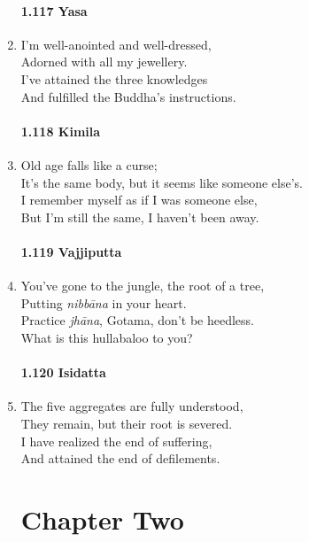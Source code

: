 \documentclass[10pt, openany]{book}
\begin{document}
\begin{enumerate}
\subsubsection*{1.117 Yasa}

\item I’m well-anointed and well-dressed,\\
Adorned with all my jewellery.\\
I’ve attained the three knowledges\\
And fulfilled the Buddha’s instructions.

\subsubsection*{1.118 Kimila}

\item Old age falls like a curse;\\
It’s the same body, but it seems like someone else’s.\\
I remember myself as if I was someone else,\\
But I’m still the same, I haven’t been away.

\subsubsection*{1.119 Vajjiputta}

\item You’ve gone to the jungle, the root of a tree,\\
Putting \emph{nibbāna} in your heart.\\
Practice \emph{jhāna}, Gotama, don’t be heedless.\\
What is this hullabaloo to you?

\subsubsection*{1.120 Isidatta}

\item The five aggregates are fully understood,\\
They remain, but their root is severed.\\
I have realized the end of suffering,\\
And attained the end of defilements.

\chapter*{Chapter Two}


\end{enumerate}
\end{document}
